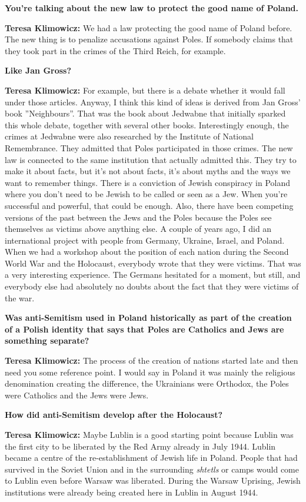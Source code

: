 \textbf{You're talking about the new law to protect the good name of Poland.} 

\textbf{Teresa Klimowicz:} We had a law protecting the good name of Poland before. The new thing is to penalize accusations against Poles. If somebody claims that they took part in the crimes of the Third Reich, for example. 

\textbf{Like Jan Gross?} 

\textbf{Teresa Klimowicz:} For example, but there is a debate whether it would fall under those articles. Anyway, I think this kind of ideas is derived from Jan Gross’ book ''Neighbours''. That was the book about Jedwabne that initially sparked this whole debate, together with several other books. Interestingly enough, the crimes at Jedwabne were also researched by the Institute of National Remembrance. They admitted that Poles participated in those crimes. The new law is connected to the same institution that actually admitted this. They try to make it about facts, but it's not about facts, it's about myths and the ways we want to remember things. There is a conviction of Jewish conspiracy in Poland where you don't need to be Jewish to be called or seen as a Jew. When you’re successful and powerful, that could be enough. Also, there have been competing versions of the past between the Jews and the Poles because the Poles see themselves as victims above anything else. A couple of years ago, I did an international project with people from Germany, Ukraine, Israel, and Poland. When we had a workshop about the position of each nation during the Second World War and the Holocaust, everybody wrote that they were victims. That was a very interesting experience. The Germans hesitated for a moment, but still, and everybody else had absolutely no doubts about the fact that they were victims of the war.  

\textbf{Was anti-Semitism used in Poland historically as part of the creation of a Polish identity that says that Poles are Catholics and Jews are something separate?} 

\textbf{Teresa Klimowicz:} The process of the creation of nations started late and then need you some reference point. I would say in Poland it was mainly the religious denomination creating the difference, the Ukrainians were Orthodox, the Poles were Catholics and the Jews were Jews.  

\textbf{How did anti-Semitism develop after the Holocaust?}  

\textbf{Teresa Klimowicz:} Maybe Lublin is a good starting point because Lublin was the first city to be liberated by the Red Army already in July 1944. Lublin became a centre of the re-establishment of Jewish life in Poland. People that had survived in the Soviet Union and in the surrounding \textit{shtetls} or camps would come to Lublin even before Warsaw was liberated. During the Warsaw Uprising, Jewish institutions were already being created here in Lublin in August 1944. 

